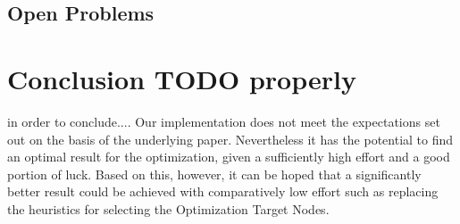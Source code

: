 \documentclass[
	accentcolor=1c,%
	type=intern,
	marginpar=false,
	ruledheaders=section,
	class=report,
	BCOR=5mm,
      parskip=half-,
	fontsize=10pt
	]{tudapub}
\begin{document}
		\subsection{Open Problems}

	\section{Conclusion TODO properly}
	in order to conclude....
	Our implementation does not meet the expectations set out on the basis of the underlying paper.
	Nevertheless it has the potential to find an optimal result for the optimization, given a sufficiently high effort and a good portion of luck.
	Based on this, however, it can be hoped that a significantly better result could be achieved with comparatively low effort such as replacing the heuristics for selecting the Optimization Target Nodes.
\end{document}
